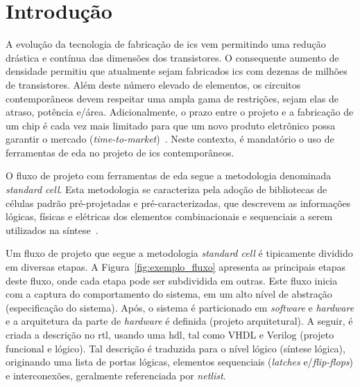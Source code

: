 \chapter{Introdução}
\label{cap:introducao}

A evolução da tecnologia de fabricação de \acp{ic} vem permitindo uma redução drástica e contínua das dimensões dos transistores.
O consequente aumento de densidade permitiu que atualmente sejam fabricados \acp{ic} com dezenas de milhões de transistores.
Além deste número elevado de elementos, os circuitos contemporâneos devem respeitar uma ampla gama de restrições, sejam elas de atraso, potência e\@/\@ou área.
Adicionalmente, o prazo entre o projeto e a fabricação de um chip é cada vez mais limitado para que um novo produto eletrônico possa garantir o mercado (\textit{time-to-market})~\cite{papa2011physical}.
Neste contexto, é mandatório o uso de ferramentas de \ac{eda} no projeto de \acp{ic} contemporâneos.

O fluxo de projeto com ferramentas de \ac{eda} segue a metodologia denominada \textit{standard cell}.
Esta metodologia se caracteriza pela adoção de bibliotecas de células padrão pré-projetadas e pré-caracterizadas, que descrevem as informações lógicas, físicas e elétricas dos elementos combinacionais e sequenciais a serem utilizados na síntese~\cite{kahng2011vlsi}.

Um fluxo de projeto que segue a metodologia \textit{standard cell} é tipicamente dividido em diversas etapas.
A Figura~\ref{fig:exemplo_fluxo} apresenta as principais etapas deste fluxo, onde cada etapa pode ser subdividida em outras.
Este fluxo inicia com a captura do comportamento do sistema, em um alto nível de abstração (especificação do sistema).
Após, o sistema é particionado em \textit{software} e \textit{hardware} e a arquitetura da parte de \textit{hardware} é definida (projeto arquitetural).
A seguir, é criada a descrição no \ac{rtl}, usando uma \ac{hdl}, tal como VHDL e Verilog (projeto funcional e lógico).
Tal descrição é traduzida para o nível lógico (síntese lógica), originando uma lista de portas lógicas, elementos sequenciais (\textit{latches} e\@/\@ou \textit{flip-flops}) e interconexões, geralmente referenciada por \textit{netlist}.


